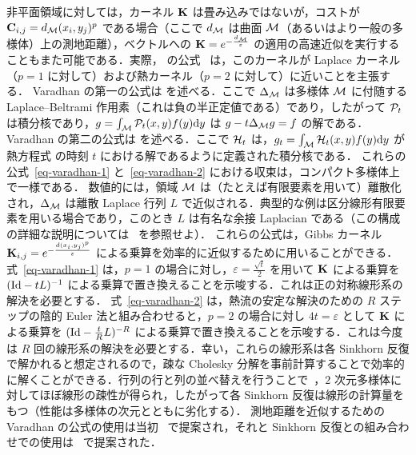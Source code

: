\begin{rem}[熱近似における測地線]\label{rem-geod-heat}
非平面領域に対しては，カーネル $\mathrm{\textbf{K}}$ は畳み込みではないが，コストが $\mathrm{\textbf{C}}_{i,j}=d_{\mathcal{M}}(x_i,y_j)^p$ である場合（ここで $d_{\mathcal{M}}$ は曲面 $\mathcal{M}$（あるいはより一般の多様体）上の測地距離），ベクトルへの $\mathrm{\textbf{K}}=e^{-\frac{d_{\mathcal{M}}}{\varepsilon}}$ の適用の高速近似を実行することもまた可能である．実際，\citeauthor{varadhan-1967} の公式~\citeyearpar{varadhan-1967} は，このカーネルが Laplace カーネル（$p=1$ に対して）および熱カーネル（$p=2$ に対して）に近いことを主張する．
%
Varadhan の第一の公式は
を述べる．ここで $\Delta_{\mathcal{M}}$ は多様体 $\mathcal{M}$ に付随する Laplace--Beltrami 作用素（これは負の半正定値である）であり，したがって
$\mathcal{P}_t$ は積分核であり，$g = \int_{\mathcal{M}} \mathcal{P}_t(x,y) f(y) \mathrm{d} y$ は $g - t \Delta_{\mathcal{M}} g = f$ の解である．
%
Varadhan の第二の公式は
を述べる．ここで $\mathcal{H}_t$ は，$g_t = \int_{\mathcal{M}} \mathcal{H}_t(x,y) f(y) \mathrm{d} y$ が熱方程式
の時刻 $t$ における解であるように定義された積分核である．
これらの公式~\eqref{eq-varadhan-1} と~\eqref{eq-varadhan-2} における収束は，コンパクト多様体上で一様である．
%
数値的には，領域 $\mathcal{M}$ は（たとえば有限要素を用いて）離散化され，$\Delta_{\mathcal{M}}$ は離散 Laplace 行列 $L$ で近似される．典型的な例は区分線形有限要素を用いる場合であり，このとき $L$ は有名な余接 Laplacian である（この構成の詳細な説明については~\citep{botsch-2010} を参照せよ）．
%
これらの公式は，Gibbs カーネル $\mathrm{\textbf{K}}_{i,j}=e^{-\frac{d(x_i,y_j)^p}{\varepsilon}}$ による乗算を効率的に近似するために用いることができる．
%
式~\eqref{eq-varadhan-1} は，$p=1$ の場合に対し，$\varepsilon=\frac{\sqrt{t}}{2}$ を用いて $\mathrm{\textbf{K}}$ による乗算を $(\mathrm{Id}-t L)^{-1}$ による乗算で置き換えることを示唆する．これは正の対称線形系の解決を必要とする．
%
式~\eqref{eq-varadhan-2} は，熱流の安定な解決のための $R$ ステップの陰的 Euler 法と組み合わせると，$p=2$ の場合に対し $4 t=\varepsilon$ として $\mathrm{\textbf{K}}$ による乗算を $(\mathrm{Id}-\frac{t}{R} L)^{-R}$ による乗算で置き換えることを示唆する．これは今度は $R$ 回の線形系の解決を必要とする．幸い，これらの線形系は各 Sinkhorn 反復で解かれると想定されるので，疎な Cholesky 分解を事前計算することで効率的に解くことができる．行列の行と列の並べ替えを行うことで~\citep{george1989evolution}，$2$ 次元多様体に対してほぼ線形の疎性が得られ，したがって各 Sinkhorn 反復は線形の計算量をもつ（性能は多様体の次元とともに劣化する）．
%
測地距離を近似するための Varadhan の公式の使用は当初~\citep{Crane2013} で提案され，それと Sinkhorn 反復との組み合わせでの使用は~\citep{2015-solomon-siggraph} で提案された．
%
\end{rem}


